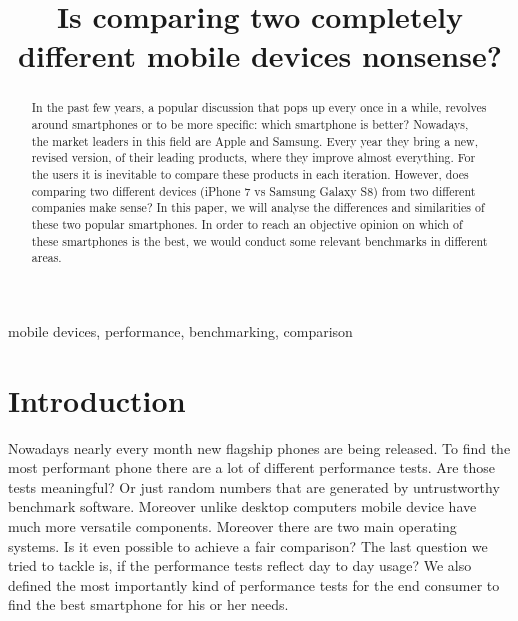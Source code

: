 \documentclass[conference, 11pt]{IEEEtran}
\begin{document}
\title{Is comparing two completely different mobile devices nonsense?\\
}

\author{
\and
{}
}

\maketitle

\begin{abstract}
In the past few years, a popular discussion that pops up every once in a while, revolves around smartphones or to be more specific: which smartphone is better? Nowadays, the market leaders in this field are Apple and Samsung. Every year they bring a new, revised version, of their leading products, where they improve almost everything. For the users it is inevitable to compare these products in each iteration. However, does comparing two different devices (iPhone 7 vs Samsung Galaxy S8) from two different companies make sense? In this paper, we will analyse the differences and similarities of these two popular smartphones. In order to reach an objective opinion on which of these smartphones is the best, we would conduct some relevant benchmarks in different areas.
\end{abstract}

\begin{IEEEkeywords}
mobile devices, performance, benchmarking, comparison
\end{IEEEkeywords}

\section{Introduction}
Nowadays nearly every month new flagship phones are being released. To find the most performant phone there are a lot of different performance tests. Are those tests meaningful? Or just random numbers that are generated by untrustworthy benchmark software. Moreover unlike desktop computers mobile device have much more versatile components. Moreover there are two main operating systems. Is it even possible to achieve a fair comparison? The last question we tried to tackle is, if the performance tests reflect day to day usage? We also defined the most importantly kind of performance tests for the end consumer to find the best smartphone for his or her needs.
\end{document}
